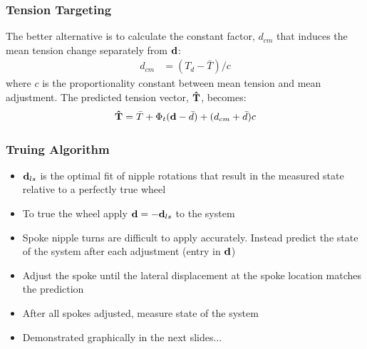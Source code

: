 \documentclass[mathserif]{beamer}
\begin{document}
\begin{frame}
        \frametitle{Tension Targeting}        
        The better alternative is to calculate the constant factor, $d_{cm}$ that induces the mean tension change separately from $\bf d$:
        \begin{align*}
            d_{cm} &=  (T_d - \bar T)/c
        \end{align*}
        where $c$ is the proportionality constant between mean tension and mean adjustment.  The predicted tension vector, $\bf \hat T$, becomes:
        \begin{align*}
            \bf \hat T &=  \bar T+\Phi_t({\bf d}- \bar d)+ (d_{cm}+ \bar d)c \\
        \end{align*}
\end{frame}

\begin{frame}
        \frametitle{Truing Algorithm}
        \begin{itemize}
          \item ${\bf d}_{ls}$ is the optimal fit of nipple rotations that result in the measured state relative to a perfectly true wheel
          \item To true the wheel apply ${\bf d=-d}_{ls}$ to the system
          \item Spoke nipple turns are difficult to apply accurately.  Instead predict the state of the system after each adjustment (entry in $\bf d$)
          \item Adjust the spoke until the lateral displacement at the spoke location matches the prediction
          \item After all spokes adjusted, measure state of the system
          \item Demonstrated graphically in the next slides...
        \end{itemize}
\end{frame}

\end{document}
